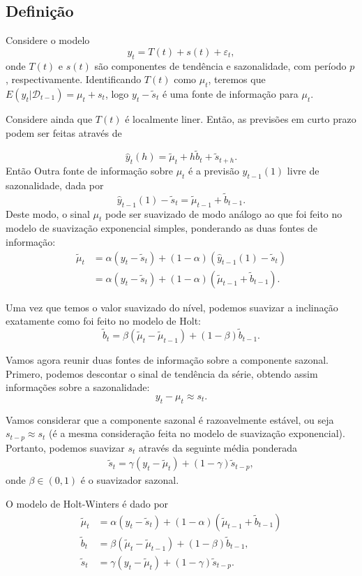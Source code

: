 \documentclass[
  letterpaper,
  DIV=11,
  numbers=noendperiod]{scrartcl}
\theoremstyle{definition}
\theoremstyle{definition}
\theoremstyle{plain}
\theoremstyle{plain}
\theoremstyle{remark}
\begin{document}
\subsection{Definição}\label{definiuxe7uxe3o-1}

Considere o modelo \[y_t = T(t) + s(t)+\varepsilon_t,\] onde \(T(t)\) e
\(s(t)\) são componentes de tendência e sazonalidade, com período \(p\),
respectivamente. Identificando \(T(t)\) como \(\mu_t\), teremos que
\(E(y_t|\mathcal{D}_{t-1})=\mu_t+s_t\), logo \(y_t-\tilde{s}_t\) é uma
fonte de informação para \(\mu_t\).

Considere ainda que \(T(t)\) é localmente liner. Então, as previsões em
curto prazo podem ser feitas através de

\[\hat{y}_t(h) = \tilde{\mu}_t + h \tilde{b}_t + \tilde{s}_{t+h}.\]
Então Outra fonte de informação sobre \(\mu_t\) é a previsão
\(\hat{y}_{t-1}(1)\) livre de sazonalidade, dada por
\[\hat{y}_{t-1}(1)-\tilde{s}_{t}=\tilde{\mu}_{t-1} + \tilde{b}_{t-1}.\]
Deste modo, o sinal \(\mu_t\) pode ser suavizado de modo análogo ao que
foi feito no modelo de suavização exponencial simples, ponderando as
duas fontes de informação: \begin{align*}
     \tilde{\mu}_t &= \alpha ( y_t - \tilde{s}_t) + (1-\alpha) (\hat{y}_{t-1}(1) -\tilde{s}_{t})\\
     &= \alpha (y_t - \tilde{s}_t) + (1-\alpha) (\tilde{\mu}_{t-1}+ \tilde{b}_{t-1}).
    \end{align*}

Uma vez que temos o valor suavizado do nível, podemos suavizar a
inclinação exatamente como foi feito no modelo de Holt:
\[\tilde{b}_t = \beta (\tilde{\mu}_t - \tilde{\mu}_{t-1}) + (1-\beta) \tilde{b}_{t-1}.\]

Vamos agora reunir duas fontes de informação sobre a componente sazonal.
Primero, podemos descontar o sinal de tendência da série, obtendo assim
informações sobre a sazonalidade: \[y_t - \mu_t\approx s_t.\]

Vamos considerar que a componente sazonal é razoavelmente estável, ou
seja \(s_{t-p}\approx s_t\) (é a mesma consideração feita no modelo de
suavização exponencial). Portanto, podemos suavizar \(s_t\) através da
seguinte média ponderada \begin{align*}
    \tilde{s}_t = \gamma (y_t - \tilde{\mu}_t) + (1-\gamma) \tilde{s}_{t-p},
    \end{align*} onde \(\beta\in(0,1)\) é o suavizador sazonal.

O modelo de Holt-Winters é dado por \begin{align*}
    \tilde{\mu}_t &=\alpha (y_t - \tilde{s}_t) + (1-\alpha) (\tilde{\mu}_{t-1}+ \tilde{b}_{t-1}) \\
        \tilde{b}_t &= \beta (\tilde{\mu}_t - \tilde{\mu}_{t-1}) + (1-\beta) \tilde{b}_{t-1}
,\\
    \tilde{s}_t &= \gamma (y_t - \tilde{\mu}_t) + (1-\gamma) \tilde{s}_{t-p}.
    \end{align*}
\end{document}
